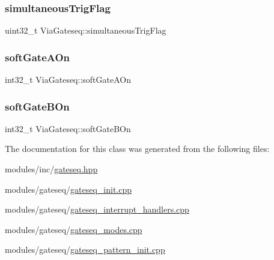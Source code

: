 \mbox{\label{class_via_gateseq_ab15d726ba5d302f110c2fa9b516aac45}} 
\subsubsection{\texorpdfstring{simultaneous\+Trig\+Flag}{simultaneousTrigFlag}}
{\footnotesize\ttfamily uint32\+\_\+t Via\+Gateseq\+::simultaneous\+Trig\+Flag}

\mbox{\label{class_via_gateseq_a08cc58f74037e3c3b1218a9f94126faa}} 
\subsubsection{\texorpdfstring{soft\+Gate\+A\+On}{softGateAOn}}
{\footnotesize\ttfamily int32\+\_\+t Via\+Gateseq\+::soft\+Gate\+A\+On}

\mbox{\label{class_via_gateseq_a8be6a729cb7703bd94de42cb59a17241}} 
\subsubsection{\texorpdfstring{soft\+Gate\+B\+On}{softGateBOn}}
{\footnotesize\ttfamily int32\+\_\+t Via\+Gateseq\+::soft\+Gate\+B\+On}



The documentation for this class was generated from the following files\+:\begin{DoxyCompactItemize}
\item 
modules/inc/\mbox{\hyperlink{gateseq_8hpp}{gateseq.\+hpp}}\item 
modules/gateseq/\mbox{\hyperlink{gateseq__init_8cpp}{gateseq\+\_\+init.\+cpp}}\item 
modules/gateseq/\mbox{\hyperlink{gateseq__interrupt__handlers_8cpp}{gateseq\+\_\+interrupt\+\_\+handlers.\+cpp}}\item 
modules/gateseq/\mbox{\hyperlink{gateseq__modes_8cpp}{gateseq\+\_\+modes.\+cpp}}\item 
modules/gateseq/\mbox{\hyperlink{gateseq__pattern__init_8cpp}{gateseq\+\_\+pattern\+\_\+init.\+cpp}}\end{DoxyCompactItemize}
